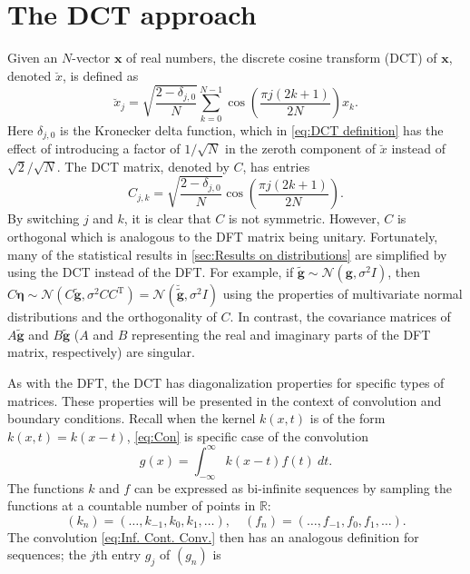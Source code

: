 \documentclass[12pt]{book}
\newcommand{\gVec}{\mathbf{g}}	%
\newcommand{\gnoiseVec}{\widetilde{\mathbf{g}}}	%
\newcommand{\trans}{\mathrm{T}}	%
\newcommand{\dct}[1]{\breve{#1}}	%
\newcommand{\noise}{\eta}	%
\newcommand{\noiseSD}{\sigma}	%
\newcommand{\noiseVec}{\bm{\noise}}	%
\begin{document}
\chapter{The DCT approach} \label{sec:DCT}
Given an $N$-vector $\mathbf{x}$ of real numbers, the discrete cosine transform (DCT) of $\mathbf{x}$, denoted $\dct{x}$, is defined as
\begin{equation}
\label{eq:DCT definition}
\dct{x}_j = \sqrt{\frac{2 - \delta_{j,0}}{N}} \sum_{k=0}^{N-1} \cos\left(\frac{\pi{j}(2k + 1)}{2N}\right) x_k.
\end{equation}
Here $\delta_{j,0}$ is the Kronecker delta function, which in \eqref{eq:DCT definition} has the effect of introducing a factor of $1/\sqrt{N}$ in the zeroth component of $\dct{x}$ instead of $\sqrt{2}/\sqrt{N}$. The DCT matrix, denoted by $C$, has entries
\begin{equation}
\label{eq:DCT matrix}
C_{j,k} = \sqrt{\frac{2 - \delta_{j,0}}{N}} \cos\left(\frac{\pi{j}(2k + 1)}{2N}\right).
\end{equation}
By switching $j$ and $k$, it is clear that $C$ is not symmetric. However, $C$ is orthogonal which is analogous to the DFT matrix being unitary. Fortunately, many of the statistical results in \ref{sec:Results on distributions} are simplified by using the DCT instead of the DFT. For example, if $\gnoiseVec \sim \mathcal{N}(\gVec,\noiseSD^2 I)$, then $C\noiseVec \sim \mathcal{N}(C\gnoiseVec,\noiseSD^2 CC^\trans) = \mathcal{N}(\dct{\gnoiseVec},\noiseSD^2 I)$ using the properties of multivariate normal distributions and the orthogonality of $C$. In contrast, the covariance matrices of $A\gnoiseVec$ and $B\gnoiseVec$ ($A$ and $B$ representing the real and imaginary parts of the DFT matrix, respectively) are singular. \par 
As with the DFT, the DCT has diagonalization properties for specific types of matrices. These properties will be presented in the context of convolution and boundary conditions. Recall when the kernel $k(x,t)$ is of the form $k(x,t) = k(x-t)$, \eqref{eq:Con} is specific case of the convolution
\begin{equation}
\label{eq:Inf. Cont. Conv.}
g(x) = \int_{-\infty}^{\infty} k(x-t)f(t) ~dt.
\end{equation}
The functions $k$ and $f$ can be expressed as bi-infinite sequences by sampling the functions at a countable number of points in $\mathbb{R}$:
\[(k_n) = (\ldots,k_{-1},k_{0},k_{1},\ldots), \quad (f_n) = (\ldots,f_{-1},f_{0},f_{1},\ldots).\]
The convolution \eqref{eq:Inf. Cont. Conv.} then has an analogous definition for sequences; the $j$th entry $g_j$ of $(g_n)$ is
\end{document}
